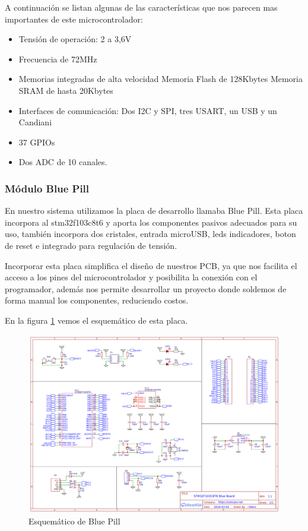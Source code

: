A continuación se listan algunas de las características que nos parecen mas importantes de este microcontrolador:

\begin{itemize}
    \item Tensión de operación: 2 a 3,6V
    \item Frecuencia de 72MHz
    \item Memorias integradas de alta velocidad
    \subitem Memoria Flash de 128Kbytes
    \subitem Memoria SRAM de hasta 20Kbytes
    \item Interfaces de comunicación: Dos I2C y SPI, tres USART, un USB y un Candiani
    \item 37 GPIOs
    \item Dos ADC de 10 canales.
\end{itemize}

\subsubsection{Módulo Blue Pill}

En nuestro sistema utilizamos la placa de desarrollo llamaba Blue Pill. Esta placa incorpora al stm32f103c8t6 y aporta los componentes pasivos
adecuados para su uso, también incorpora dos cristales, entrada microUSB, leds indicadores, boton de reset e integrado para regulación de tensión. \par
Incorporar esta placa simplifica el diseño de nuestros PCB, ya que nos facilita el acceso a los pines del microcontrolador y posibilita la conexión
con el programador, además nos permite desarrollar un proyecto donde soldemos de forma manual los componentes, reduciendo costos.\par
En la figura \ref{fig:sch_bluepill} vemos el esquemático de esta placa.

\begin{figure}[htb]
	\centering
	\includegraphics[scale=0.4]{images/esquematico_bluepill.png}
    \caption{Esquemático de Blue Pill}
	\label{fig:sch_bluepill}
\end{figure}
